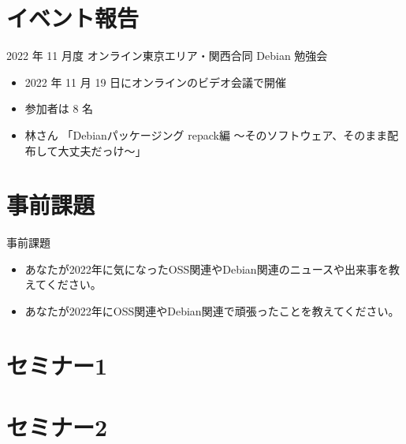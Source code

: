 \section{イベント報告}

\begin{frame}{2022 年 11 月度 オンライン東京エリア・関西合同 Debian 勉強会}
\begin{itemize}
\item 2022 年 11 月 19 日にオンラインのビデオ会議で開催
\item 参加者は 8 名
\item 林さん 「Debianパッケージング repack編 ～そのソフトウェア、そのまま配布して大丈夫だっけ～」
\end{itemize}
\end{frame}


\section{事前課題}


\begin{frame}{事前課題}
  \begin{itemize}
  \item あなたが2022年に気になったOSS関連やDebian関連のニュースや出来事を教えてください。
  \item あなたが2022年にOSS関連やDebian関連で頑張ったことを教えてください。
  \end{itemize}
\end{frame}

{\footnotesize
 
}

%

\section{セミナー1}

\section{セミナー2}


